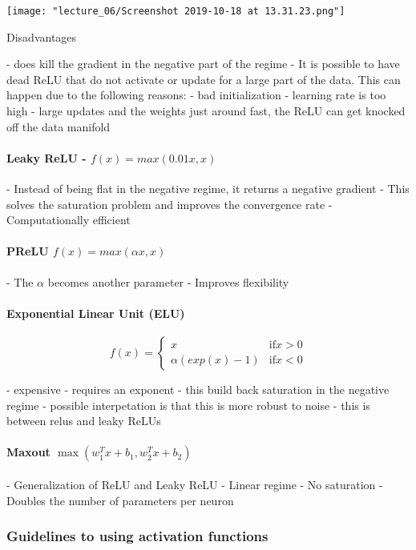 \texttt{[image: "lecture\_06/Screenshot 2019-10-18 at 13.31.23.png"]}

 Disadvantages

- does kill the gradient in the negative part of the regime
- It is possible to have dead ReLU that do not activate or update for a large part of the data. This can happen due to the following reasons:
  - bad initialization
  - learning rate is too high - large updates and the weights just around fast, the ReLU can get knocked off the data manifold

\paragraph{Leaky ReLU - $f(x) = max(0.01x, x)$ }

- Instead of being flat in the negative regime, it returns a negative gradient
- This solves the saturation problem and improves the convergence rate
- Computationally efficient

\paragraph{PReLU $f(x) = max(\alpha x, x)$}

- The $\alpha$ becomes another parameter
- Improves flexibility

\paragraph{Exponential Linear Unit (ELU)}

$$ f(x) = \begin{cases} x & \text{if} x > 0 \\ \alpha(exp(x)-1) & \text{if} x < 0 \end{cases}  $$ 

- expensive - requires an exponent
- this build back saturation in the negative regime 
- possible interpetation is that this is more robust to noise
- this is between relus and leaky ReLUs

\paragraph{Maxout $\max(w_1^Tx + b_1, w_2^T x + b_2)$}

- Generalization of ReLU and Leaky ReLU
- Linear regime 
- No saturation
- Doubles the number of parameters per neuron

\subsubsection{Guidelines to using activation functions }

